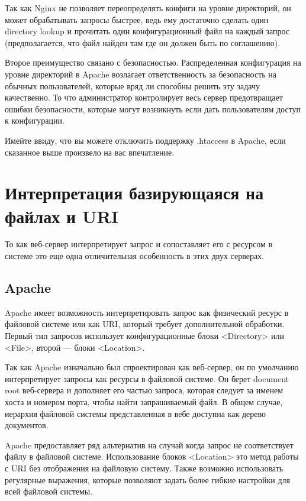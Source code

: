 \documentclass[14pt, a4paper]{article}
\begin{document}
Так как Nginx не позволяет переопределять конфиги на уровне директорий, он может обрабатывать 
запросы быстрее, ведь ему достаточно сделать один directory lookup и прочитать один 
конфигурационный файл на каждый запрос (предполагается, что файл найден там где он должен быть по соглашению).


Второе преимущество связано с безопасностью. Распределенная конфигурация на уровне 
директорий в Apache возлагает ответственность за безопасность на обычных пользователей, 
которые вряд ли способны решить эту задачу качественно. То что администратор контролирует 
весь сервер предотвращает ошибки безопасности, которые могут возникнуть если дать пользователям доступ к конфигурации.


Имейте ввиду, что вы можете отключить поддержку .htaccess в Apache, 
если сказанное выше произвело на вас впечатление.\\




\section*{Интерпретация базирующаяся на файлах и URI}

То как веб-сервер интерпретирует запрос и сопоставляет его с ресурсом в системе это 
еще одна отличительная особенность в этих двух серверах.

\subsection*{Apache}
Apache имеет возможность интерпретировать запрос как физический ресурс в файловой системе 
или как URI, который требует дополнительной обработки. Первый тип запросов использует 
конфигурационные блоки <Directory> или <File>, второй — блоки <Location>.


Так как Apache изначально был спроектирован как веб-сервер, он по умолчанию интерпретирует запросы 
как ресурсы в файловой системе. Он берет document root веб-сервера и дополняет его частью запроса, 
которая следует за именем хоста и номером порта, чтобы найти запрашиваемый файл. В общем случае, 
иерархия файловой системы представленная в вебе доступна как дерево документов.


Apache предоставляет ряд альтернатив на случай когда запрос не соответствует файлу в файловой 
системе. Использование блоков <Location> это метод работы с URI без отображения на файловую 
систему. Также возможно использовать регулярные выражения, которые позволяют задать более 
гибкие настройки для всей файловой системы.
\end{document}
